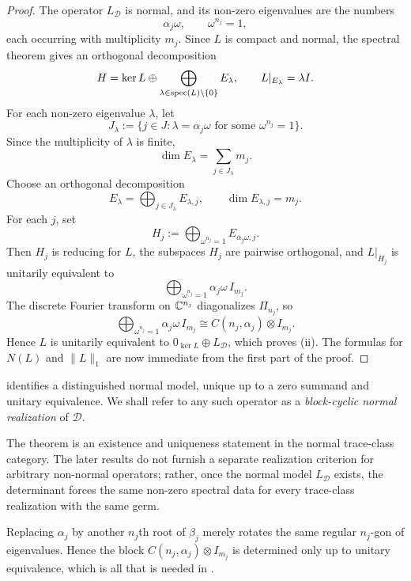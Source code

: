 \begin{proof}
  The operator \(L_{\mathcal D}\) is normal, and its non-zero
  eigenvalues are the numbers
  \[
    \alpha_j\omega,
    \qquad
    \omega^{n_j}=1,
  \]
  each occurring with multiplicity \(m_j\). Since \(L\) is compact and
  normal, the spectral theorem \cite{Conway1990Course} gives an
  orthogonal decomposition
  \[
    H=\ker L\oplus\bigoplus_{\lambda\in\operatorname{spec}(L)\setminus\{0\}}E_\lambda,
    \qquad
    L|_{E_\lambda}=\lambda I.
  \]
  For each non-zero eigenvalue \(\lambda\), let
  \[
    J_\lambda
    :=\bigl\{j\in J:\lambda=\alpha_j\omega
      \text{ for some }\omega^{n_j}=1\bigr\}.
  \]
  Since the multiplicity of \(\lambda\) is finite,
  \[
    \dim E_\lambda=\sum_{j\in J_\lambda}m_j.
  \]
  Choose an orthogonal decomposition
  \[
    E_\lambda=\bigoplus_{j\in J_\lambda}E_{\lambda,j},
    \qquad
    \dim E_{\lambda,j}=m_j.
  \]
  For each \(j\), set
  \[
    H_j:=\bigoplus_{\omega^{n_j}=1}E_{\alpha_j\omega,j}.
  \]
  Then \(H_j\) is reducing for \(L\), the subspaces \(H_j\) are pairwise
  orthogonal, and \(L|_{H_j}\) is unitarily equivalent to
  \[
    \bigoplus_{\omega^{n_j}=1}\alpha_j\omega\,I_{m_j}.
  \]
  The discrete Fourier transform on \(\mathbb{C}^{n_j}\) diagonalizes
  \(\Pi_{n_j}\), so
  \[
    \bigoplus_{\omega^{n_j}=1}\alpha_j\omega\,I_{m_j}
    \cong C(n_j,\alpha_j)\otimes I_{m_j}.
  \]
  Hence \(L\) is unitarily equivalent to
  \(
    0_{\ker L}\oplus L_{\mathcal D}
  \),
  which proves \textup{(ii)}. The formulas for \(N(L)\) and \(\|L\|_1\)
  are now immediate from the first part of the proof.
\end{proof}

 identifies a distinguished
normal model, unique up to a zero summand and unitary equivalence. We
shall refer to any such operator as a \emph{block-cyclic normal
realization} of \(\mathcal D\).

\begin{remark}
  \label{rem:normal-scope-trace}
  The theorem is an existence and uniqueness statement in the normal
  trace-class category. The later results do not furnish a separate
  realization criterion for arbitrary non-normal operators; rather, once
  the normal model \(L_{\mathcal D}\) exists, the determinant forces the
  same non-zero spectral data for every trace-class realization with the
  same germ.
\end{remark}

\begin{remark}
  \label{rem:choice-of-roots}
  Replacing \(\alpha_j\) by another \(n_j\)th root of \(\beta_j\) merely
  rotates the same regular \(n_j\)-gon of eigenvalues. Hence the block
  \(C(n_j,\alpha_j)\otimes I_{m_j}\) is determined only up to unitary
  equivalence, which is all that is needed in
  .
\end{remark}

